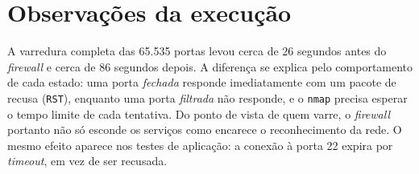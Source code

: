 \section{Observações da execução}

A varredura completa das 65.535 portas levou cerca de 26 segundos antes do
\textit{firewall} e cerca de 86 segundos depois. A diferença se explica pelo
comportamento de cada estado: uma porta \emph{fechada} responde imediatamente com um
pacote de recusa (\texttt{RST}), enquanto uma porta \emph{filtrada} não responde, e o
\texttt{nmap} precisa esperar o tempo limite de cada tentativa. Do ponto de vista de quem
varre, o \textit{firewall} portanto não só esconde os serviços como encarece o
reconhecimento da rede. O mesmo efeito aparece nos testes de aplicação: a conexão à
porta 22 expira por \textit{timeout}, em vez de ser recusada.
